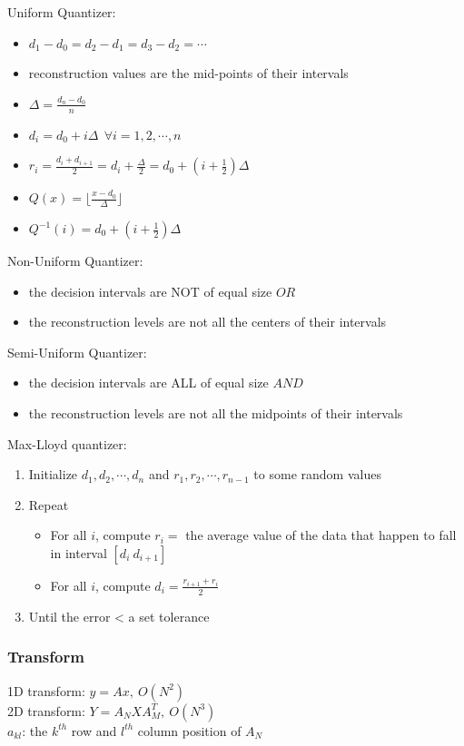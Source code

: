Uniform Quantizer:
\begin{itemize}
    \item $d_1-d_0=d_2-d_1=d_3-d_2=\cdots$
    \item reconstruction values are the mid-points of their intervals
    \item $\Delta=\frac{d_n-d_0}{n}$
    \item $d_i=d_0+i\Delta\ \ \forall i=1,2,\cdots,n$
    \item $r_i=\frac{d_i+d_{i+1}}{2}=d_i+\frac{\Delta}{2}=d_0+(i+\frac{1}{2})\Delta$
    \item $Q(x)=\lfloor \frac{x-d_0}{\Delta}\rfloor$
    \item $Q^{-1}(i)=d_0+(i+\frac{1}{2})\Delta$
\end{itemize}

Non-Uniform Quantizer:
\begin{itemize}
    \item the decision intervals are NOT of equal size $OR$
    \item the reconstruction levels are not all the centers of their intervals
\end{itemize}

Semi-Uniform Quantizer:
\begin{itemize}
    \item the decision intervals are ALL of equal size $AND$
    \item the reconstruction levels are not all the midpoints of their intervals
\end{itemize}

Max-Lloyd quantizer:
\begin{enumerate}
    \item Initialize $d_1,d_2,\cdots,d_{n}$ and $r_1,r_2,\cdots,r_{n-1}$ to some random values
    \item Repeat \begin{itemize}
        \item For all $i$, compute $r_i=$ the average value of the data that happen to fall in interval $[d_i\ d_{i+1}]$
        \item For all $i$, compute $d_i=\frac{r_{i+1}+r_i}{2}$
    \end{itemize}
    \item Until the error < a set tolerance
\end{enumerate}

\subsubsection*{Transform}
1D transform: $y=Ax,\ O(N^2)$\\
2D transform: $Y=A_NXA_M^T,\ O(N^3)$\\
$a_{kl}$: the $k^{th}$ row and $l^{th}$ column position of $A_N$\\

